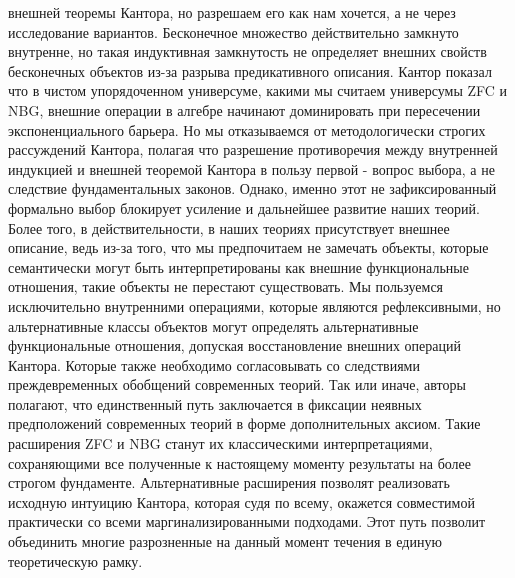 \documentclass[12pt]{article}
\begin{document}
внешней теоремы Кантора, но разрешаем его как нам хочется, а не через исследование вариантов. Бесконечное множество действительно замкнуто внутренне, но такая индуктивная замкнутость не определяет внешних свойств бесконечных объектов из-за разрыва предикативного описания. Кантор показал что в чистом упорядоченном универсуме, какими мы считаем универсумы ZFC и NBG, внешние операции в алгебре начинают доминировать при пересечении экспоненциального барьера. Но мы отказываемся от методологически строгих рассуждений Кантора, полагая что разрешение противоречия между внутренней индукцией и внешней теоремой Кантора в пользу первой - вопрос выбора, а не следствие фундаментальных законов. Однако, именно этот не зафиксированный формально выбор блокирует усиление и дальнейшее развитие наших теорий. Более того, в действительности, в наших теориях присутствует внешнее описание, ведь из-за того, что мы предпочитаем не замечать объекты, которые семантически могут быть интерпретированы как внешние функциональные отношения, такие объекты не перестают существовать. Мы пользуемся исключительно внутренними операциями, которые являются рефлексивными, но альтернативные классы объектов могут определять альтернативные функциональные отношения, допуская восстановление внешних операций Кантора. Которые также необходимо согласовывать со следствиями преждевременных обобщений современных теорий. Так или иначе, авторы полагают, что единственный путь заключается в фиксации неявных предположений современных теорий в форме дополнительных аксиом. Такие расширения ZFC и NBG станут их классическими интерпретациями, сохраняющими все полученные к настоящему моменту результаты на более строгом фундаменте. Альтернативные расширения позволят реализовать исходную интуицию Кантора, которая судя по всему, окажется совместимой практически со всеми маргинализированными подходами. Этот путь позволит объединить многие разрозненные на данный момент течения в единую теоретическую рамку.
\end{document}
